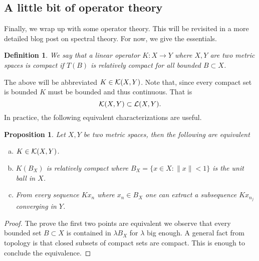\documentclass[12pt]{article}
\newtheorem{proposition}{Proposition}
\newtheorem{definition}{Definition}
\renewcommand{\norm}[1]{\lVert #1 \rVert}\renewcommand{\abs}[1]{\left| #1 \right|}
\begin{document}
\begin{CJK*}{UTF8}{gbsn}
	\section{A little bit of operator theory}
	Finally, we wrap up with some operator theory. This will be revisited in a more detailed blog post on spectral theory. For now, we give the essentials.
	\begin{definition}
		We say that a linear operator $K: X \to Y$ where $X,Y$ are two metric spaces is compact  if  $T(B)$ is relatively compact for all bounded  $B \subset  X$.
	\end{definition}
	The above will be abbreviated $K \in  \mathcal{K}(X,Y)$. Note that, since every compact set is bounded $K$ must be bounded and thus continuous. That is 
\begin{equation*}
    \mathcal{K}(X,Y)\subset \mathcal{L}(X,Y).
\end{equation*}
  In practice, the following equivalent characterizations are useful. 
  \begin{proposition}\label{equivalent}
  Let $X,Y$ be two metric spaces, then the following are equivalent
  \begin{enumerate}[a)]
    \item $K \in \mathcal{K}(X,Y)$. 
    \item $K(B_X)$ is relatively compact where  $B_X=\{ x \in X : \norm{x}<1\} $ is the unit ball in $X$. 
    \item From every sequence  $Kx_n$ where  $x_n \in B_X$ one can extract a subsequence $K {x_{n_j}}$ converging in $Y$.
\end{enumerate}
\end{proposition}
 \begin{proof}
     The prove the first two points are equivalent we observe that every bounded set $B \subset  X$ is contained in $\lambda B_X$ for $\lambda $ big enough. A general fact from topology is that closed subsets of compact sets are compact. This is enough to conclude the equivalence. 


\end{proof}
\end{CJK*}
\end{document}
